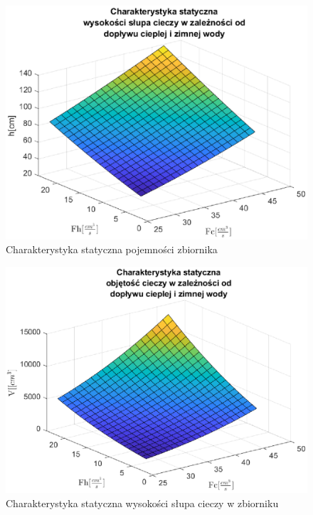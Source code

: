 \begin{figure}[h!]
   \centering
   \includegraphics{img/static/staticV.eps}
   \caption{Charakterystyka statyczna pojemności zbiornika}
   \label{fig:staticV}
\end{figure}
            
\begin{figure}[h!]
   \centering
   \includegraphics{img/static/staticH.eps}
   \caption{Charakterystyka statyczna wysokości słupa cieczy w zbiorniku}
   \label{fig:staticH}
\end{figure}
            
